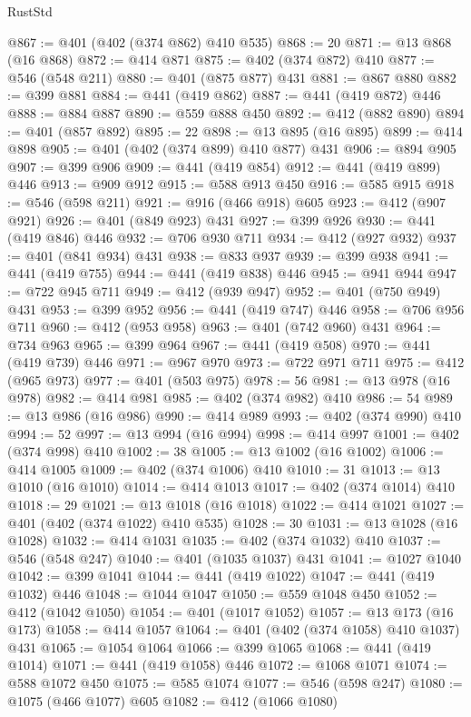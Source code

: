 \begin{lexlean}{RustStd}
\begin{coremodule}
{\begin{coremodule}
{{{{{@867 := @401 (@402 (@374 @862) @410 @535)
@868 := 20
@871 := @13 @868 (@16 @868)
@872 := @414 @871
@875 := @402 (@374 @872) @410
@877 := @546 (@548 @211)
@880 := @401 (@875 @877) @431
@881 := @867 @880
@882 := @399 @881
@884 := @441 (@419 @862)
@887 := @441 (@419 @872) @446
@888 := @884 @887
@890 := @559 @888 @450
@892 := @412 (@882 @890)
@894 := @401 (@857 @892)
@895 := 22
@898 := @13 @895 (@16 @895)
@899 := @414 @898
@905 := @401 (@402 (@374 @899) @410 @877) @431
@906 := @894 @905
@907 := @399 @906
@909 := @441 (@419 @854)
@912 := @441 (@419 @899) @446
@913 := @909 @912
@915 := @588 @913 @450
@916 := @585 @915
@918 := @546 (@598 @211)
@921 := @916 (@466 @918) @605
@923 := @412 (@907 @921)
@926 := @401 (@849 @923) @431
@927 := @399 @926
@930 := @441 (@419 @846) @446
@932 := @706 @930 @711
@934 := @412 (@927 @932)
@937 := @401 (@841 @934) @431
@938 := @833 @937
@939 := @399 @938
@941 := @441 (@419 @755)
@944 := @441 (@419 @838) @446
@945 := @941 @944
@947 := @722 @945 @711
@949 := @412 (@939 @947)
@952 := @401 (@750 @949) @431
@953 := @399 @952
@956 := @441 (@419 @747) @446
@958 := @706 @956 @711
@960 := @412 (@953 @958)
@963 := @401 (@742 @960) @431
@964 := @734 @963
@965 := @399 @964
@967 := @441 (@419 @508)
@970 := @441 (@419 @739) @446
@971 := @967 @970
@973 := @722 @971 @711
@975 := @412 (@965 @973)
@977 := @401 (@503 @975)
@978 := 56
@981 := @13 @978 (@16 @978)
@982 := @414 @981
@985 := @402 (@374 @982) @410
@986 := 54
@989 := @13 @986 (@16 @986)
@990 := @414 @989
@993 := @402 (@374 @990) @410
@994 := 52
@997 := @13 @994 (@16 @994)
@998 := @414 @997
@1001 := @402 (@374 @998) @410
@1002 := 38
@1005 := @13 @1002 (@16 @1002)
@1006 := @414 @1005
@1009 := @402 (@374 @1006) @410
@1010 := 31
@1013 := @13 @1010 (@16 @1010)
@1014 := @414 @1013
@1017 := @402 (@374 @1014) @410
@1018 := 29
@1021 := @13 @1018 (@16 @1018)
@1022 := @414 @1021
@1027 := @401 (@402 (@374 @1022) @410 @535)
@1028 := 30
@1031 := @13 @1028 (@16 @1028)
@1032 := @414 @1031
@1035 := @402 (@374 @1032) @410
@1037 := @546 (@548 @247)
@1040 := @401 (@1035 @1037) @431
@1041 := @1027 @1040
@1042 := @399 @1041
@1044 := @441 (@419 @1022)
@1047 := @441 (@419 @1032) @446
@1048 := @1044 @1047
@1050 := @559 @1048 @450
@1052 := @412 (@1042 @1050)
@1054 := @401 (@1017 @1052)
@1057 := @13 @173 (@16 @173)
@1058 := @414 @1057
@1064 := @401 (@402 (@374 @1058) @410 @1037) @431
@1065 := @1054 @1064
@1066 := @399 @1065
@1068 := @441 (@419 @1014)
@1071 := @441 (@419 @1058) @446
@1072 := @1068 @1071
@1074 := @588 @1072 @450
@1075 := @585 @1074
@1077 := @546 (@598 @247)
@1080 := @1075 (@466 @1077) @605
@1082 := @412 (@1066 @1080)
}}}}}
\end{coremodule}}
\end{coremodule}
\end{lexlean}
